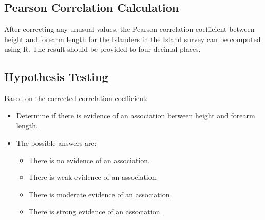 \documentclass{article}
\begin{document}
\subsection{Pearson Correlation Calculation}
After correcting any unusual values, the Pearson correlation coefficient between height and forearm length for the Islanders in the Island survey can be computed using R. The result should be provided to four decimal places.

\subsection{Hypothesis Testing}
Based on the corrected correlation coefficient:
\begin{itemize}
    \item Determine if there is evidence of an association between height and forearm length.
    \item The possible answers are:
    \begin{itemize}
        \item There is no evidence of an association.
        \item There is weak evidence of an association.
        \item There is moderate evidence of an association.
        \item There is strong evidence of an association.
    \end{itemize}
\end{itemize}
\end{document}
